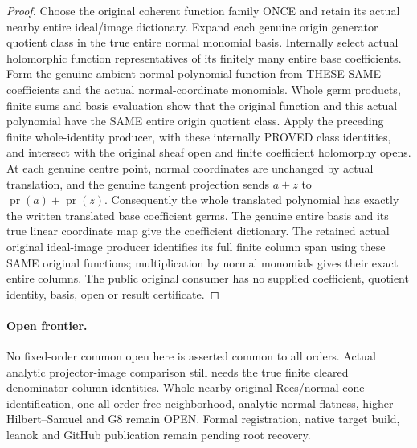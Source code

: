 \begin{proof}
Choose the original coherent function family ONCE and retain its actual
nearby entire ideal/image dictionary. Expand each genuine origin generator
quotient class in the true entire normal monomial basis. Internally select
actual holomorphic function representatives of its finitely many entire
base coefficients. Form the genuine ambient normal-polynomial function from
THESE SAME coefficients and the actual normal-coordinate monomials. Whole
germ products, finite sums and basis evaluation show that the original
function and this actual polynomial have the SAME entire origin quotient
class. Apply the preceding finite whole-identity producer, with these
internally PROVED class identities, and intersect with the original sheaf
open and finite coefficient holomorphy opens. At each genuine centre point,
normal coordinates are unchanged by actual translation, and the genuine
tangent projection sends $a+z$ to $\operatorname{pr}(a)+\operatorname{pr}(z)$.
Consequently the whole translated polynomial has exactly the written
translated base coefficient germs. The genuine entire basis and its true
linear coordinate map give the coefficient dictionary. The retained actual
original ideal-image producer identifies its full finite column span using
these SAME original functions; multiplication by normal monomials gives
their exact entire columns. The public original consumer has no supplied
coefficient, quotient identity, basis, open or result certificate.
\end{proof}

\paragraph{Open frontier.}
No fixed-order common open here is asserted common to all orders. Actual
analytic projector-image comparison still needs the true finite cleared
denominator column identities. Whole nearby original Rees/normal-cone
identification, one all-order free neighborhood, analytic normal-flatness,
higher Hilbert--Samuel and G8 remain OPEN. Formal registration, native
target build, leanok and GitHub publication remain pending root recovery.
